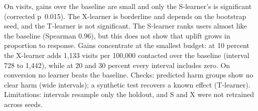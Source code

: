 On visits, gains over the baseline are small and only the \mbox{S-learner}'s is significant (corrected p~0.015). The \mbox{X-learner} is borderline and depends on the bootstrap seed, and the \mbox{T-learner} is not significant. The \mbox{S-learner} ranks users almost like the baseline (Spearman 0.96), but this does not show that uplift grows in proportion to response. Gains concentrate at the smallest budget: at 10 percent the \mbox{X-learner} adds 1,133 visits per 100,000 contacted over the baseline (interval 728 to 1,442), while at 20 and 30 percent every interval includes zero. On conversion no learner beats the baseline. Checks: predicted harm groups show no clear harm (wide intervals); a synthetic test recovers a known effect (\mbox{T-learner}). Limitations: intervals resample only the holdout, and S and X were not retrained across seeds.
